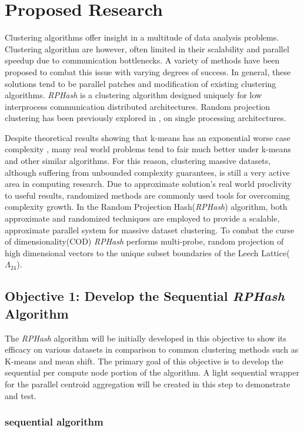 \documentclass[a4paper,10pt]{article}
\begin{document}
\section{Proposed Research} Clustering algorithms offer insight in a multitude
of data analysis problems.  Clustering algorithm are however, often limited
in their scalability and parallel speedup due to communication bottlenecks.
 A variety of methods have been  proposed to combat this issue with varying
degrees of success.  In general, these solutions tend to be parallel patches
and modification of existing clustering algorithms.  \emph{RPHash} is a
clustering algorithm designed uniquely for low interprocess communication
distributed architectures.  Random projection clustering has been previously
explored in \cite{Urruty2007,florescu09,fernrandom,avogadri09}, on single
processing architectures.

Despite theoretical results showing that k-means has an exponential worse
case complexity \cite{Vattani}, many real world problems tend to fair much
better under k-means and other similar algorithms.  For this reason, clustering
massive datasets, although suffering from unbounded complexity guarantees, is
still a very active area in computing research.  Due to approximate solution's
real world proclivity to useful results, randomized methods are commonly
used tools for overcoming complexity growth.  In the Random Projection
Hash(\emph{RPHash}) algorithm, both approximate and randomized techniques
are employed to provide a scalable, approximate parallel system for massive
dataset clustering.  To combat the curse of dimensionality(COD) \emph{RPHash}
performs multi-probe, random projection of high dimensional vectors to the
unique subset boundaries of the Leech Lattice($\Lambda_{24}$)\cite{Andoni}.

\subsection{Objective 1: Develop the  Sequential \emph{RPHash} Algorithm}
The \emph{RPHash} algorithm will be initially developed in this objective
to show its efficacy on various datasets in comparison to common clustering
methods such as K-means and mean shift.  The primary goal of this objective
is to develop the sequential per compute node portion of the algorithm.
A light sequential wrapper for the parallel centroid aggregation will be
created in this step to demonstrate and test.

\subsubsection{sequential algorithm}
\end{document}
